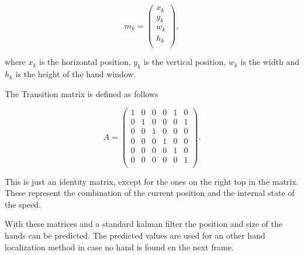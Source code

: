 \begin{equation}
 m_k = \left(
\begin{array}{c}
	x_k \\ %
	y_k \\ %
	w_k \\ %
	h_k \\ %
\end{array} \right),
\end{equation}

where $x_k$ is the horizontal position, $y_k$ is the vertical position, $w_k$ is the width and $h_k$ is the height of the hand window.

The Transition matrix is defined as follows

\begin{equation}
 A = \left(
\begin{array}{cccccc}
	1 & 0 & 0 & 0 & 1 & 0 \\
	0 & 1 & 0 & 0 & 0 & 1 \\
	0 & 0 & 1 & 0 & 0 & 0 \\
	0 & 0 & 0 & 1 & 0 & 0 \\
	0 & 0 & 0 & 0 & 1 & 0 \\
	0 & 0 & 0 & 0 & 0 & 1 \\
\end{array} \right).
\end{equation}
	
This is just an identity matrix, except for the ones on the right top in the matrix. These represent the combination of the current position and the internal state of the speed.

With these matrices and a standard kalman filter the position and size of the hands can be predicted. The predicted values are used for an other hand localization method in case no hand is found en the next frame.




% 

